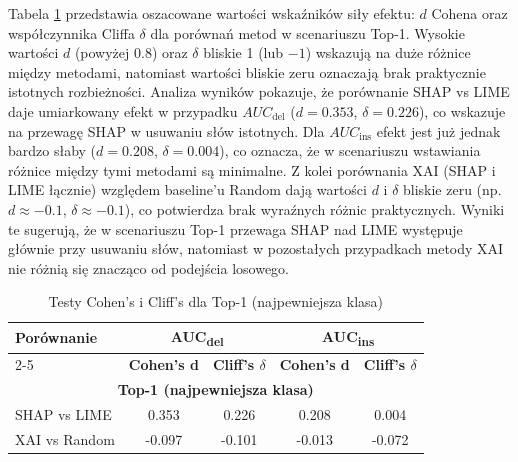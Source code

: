 \documentclass[wmii, inf, mgr]{uwmthesis}
\begin{document}
Tabela \ref{tab:tests_top1} przedstawia oszacowane wartości wskaźników siły efektu: $d$ Cohena oraz współczynnika Cliffa $\delta$ dla porównań metod w scenariuszu Top-1. Wysokie wartości $d$ (powyżej 0.8) oraz $\delta$ bliskie 1 (lub $-1$) wskazują na duże różnice między metodami, natomiast wartości bliskie zeru oznaczają brak praktycznie istotnych rozbieżności. Analiza wyników pokazuje, że porównanie SHAP vs LIME daje umiarkowany efekt w przypadku $AUC_{\text{del}}$ ($d=0.353$, $\delta=0.226$), co wskazuje na przewagę SHAP w usuwaniu słów istotnych. Dla $AUC_{\text{ins}}$ efekt jest już jednak bardzo słaby ($d=0.208$, $\delta=0.004$), co oznacza, że w scenariuszu wstawiania różnice między tymi metodami są minimalne. Z kolei porównania XAI (SHAP i LIME łącznie) względem baseline’u Random dają wartości $d$ i $\delta$ bliskie zeru (np. $d \approx -0.1$, $\delta \approx -0.1$), co potwierdza brak wyraźnych różnic praktycznych. Wyniki te sugerują, że w scenariuszu Top-1 przewaga SHAP nad LIME występuje głównie przy usuwaniu słów, natomiast w pozostałych przypadkach metody XAI nie różnią się znacząco od podejścia losowego.

\begin{table}[H]
	\centering
	\renewcommand{\arraystretch}{1.3}
	\begin{tabular}{|l|c|c|c|c|}
		\hline
		\textbf{Porównanie} & \multicolumn{2}{c|}{\textbf{AUC\textsubscript{del}}} & \multicolumn{2}{c|}{\textbf{AUC\textsubscript{ins}}} \\ \cline{2-5}
		& \textbf{Cohen's d} & \textbf{Cliff's $\delta$} & \textbf{Cohen's d} & \textbf{Cliff's $\delta$} \\ \hline
		\multicolumn{5}{|c|}{\textbf{Top-1 (najpewniejsza klasa)}} \\ \hline
		SHAP vs LIME   & 0.353 & 0.226 & 0.208 & 0.004 \\ \hline
		XAI vs Random  & -0.097 & -0.101 & -0.013 & -0.072 \\ \hline
	\end{tabular}
	\caption{Testy Cohen's i Cliff's dla Top-1 (najpewniejsza klasa)}
	\label{tab:tests_top1}
\end{table}
\end{document}
